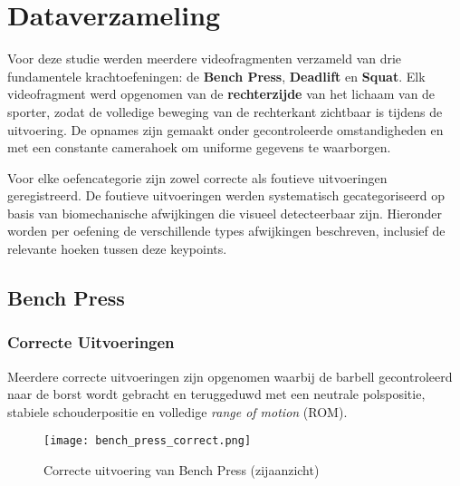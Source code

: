\chapter{Dataverzameling}
\label{ch:dataverzameling}

Voor deze studie werden meerdere videofragmenten verzameld van drie fundamentele krachtoefeningen: de \textbf{Bench Press}, \textbf{Deadlift} en \textbf{Squat}. 
Elk videofragment werd opgenomen van de \textbf{rechterzijde} van het lichaam van de sporter, zodat de volledige beweging van de rechterkant zichtbaar is tijdens de uitvoering. 
De opnames zijn gemaakt onder gecontroleerde omstandigheden en met een constante camerahoek om uniforme gegevens te waarborgen.

Voor elke oefencategorie zijn zowel correcte als foutieve uitvoeringen geregistreerd. 
De foutieve uitvoeringen werden systematisch gecategoriseerd op basis van biomechanische afwijkingen die visueel detecteerbaar zijn. 
Hieronder worden per oefening de verschillende types afwijkingen beschreven, inclusief de relevante hoeken tussen deze keypoints.

\section{Bench Press}

\subsection*{Correcte Uitvoeringen}
Meerdere correcte uitvoeringen zijn opgenomen waarbij de barbell gecontroleerd naar de borst wordt gebracht en teruggeduwd met een neutrale polspositie, stabiele schouderpositie en volledige \textit{range of motion} (ROM).

\begin{figure}[h]
    \centering
    \texttt{[image: bench\_press\_correct.png]}
    \caption{Correcte uitvoering van Bench Press (zijaanzicht)}
    \label{fig:bench_correct}
\end{figure}

